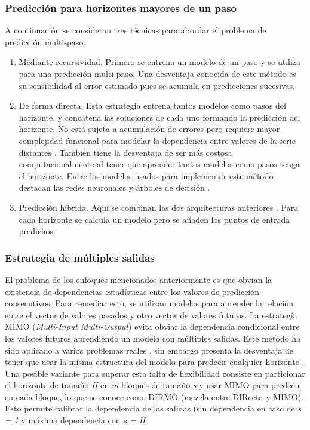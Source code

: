 \documentclass{llncs}
\begin{document}
\subsubsection{Predicción para horizontes mayores de un paso\\}
A continuación se consideran tres técnicas para abordar el problema de predicción multi-paso. 
\begin{enumerate}
\item{Mediante recursividad}. Primero se entrena un modelo de un paso y se utiliza para una predicción multi-paso. Una desventaja conocida de este método es su sensibilidad al error estimado pues se acumula en predicciones sucesivas.
\item{De forma directa}. Esta estrategia entrena tantos modelos como pasos del horizonte, y concatena las soluciones de cada uno formando la predicción del horizonte. No está sujeta a acumulación de errores pero requiere mayor complejidad funcional \cite{Tong1983} para modelar la dependencia entre valores de la serie distantes \cite{Guo1999559}. También tiene la desventaja de ser más costosa computacionalmente al tener que aprender tantos modelos como pasos tenga el horizonte. Entre los modelos usados para implementar este método destacan las redes neuronales \cite{Kline2004226} y árboles de decisión \cite{Tran20099378}.
\item{Predicción híbrida}. Aquí se combinan las dos arquitecturas anteriores \cite{Sorjamaa2006143}. Para cada horizonte se calcula un modelo pero se añaden los puntos de entrada predichos.
\end{enumerate}

\subsubsection{Estrategia de múltiples salidas\\}
El problema de los enfoques mencionados anteriormente es que obvian la existencia de dependencias estadísticas entre los valores de predicción consecutivos. Para remediar esto, se utilizan modelos para aprender la relación entre el vector de valores pasados y otro vector de valores futuros. La estrategía MIMO (\emph{Multi-Input Multi-Output}) \cite{Bontempi2008145} \cite{Bontempi2011689} evita obviar la dependencia condicional entre los valores futuros aprendiendo un modelo con múltiples salidas. Este método ha sido aplicado a varios problemas reales \cite{Bontempi2008145} \cite{Bontempi2011689} \cite{BenTaieb20093054} \cite{BenTaieb20101950}, sin embargo presenta la desventaja de tener que usar la misma estructura del modelo para predecir cualquier horizonte \cite{BenTaieb20093054}. Una posible variante para superar esta falta de flexibilidad consiste en particionar el horizonte de tamaño \emph{H} en \emph{m} bloques de tamaño \emph{s} y usar MIMO para predecir en cada bloque, lo que se conoce como DIRMO (mezcla entre DIRecta y MIMO). Esto permite calibrar la dependencia de las salidas (sin dependencia en caso de \emph{s = 1} y máxima dependencia con \emph{s = H}
\end{document}

